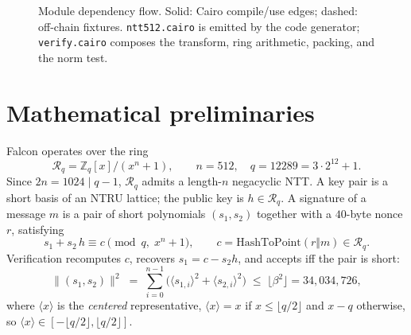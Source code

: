 \documentclass[11pt]{article}
\newcommand{\Zq}{\mathbb{Z}_q}
\newcommand{\Rq}{\mathcal{R}_q}
\newcommand{\HtP}{\mathrm{HashToPoint}}
\begin{document}
\begin{figure}[h]
\centering
{}
\caption{Module dependency flow. Solid: Cairo compile/use edges; dashed: off-chain
fixtures. \texttt{ntt512.cairo} is emitted by the code generator; \texttt{verify.cairo}
composes the transform, ring arithmetic, packing, and the norm test.}
\label{fig:files}
\end{figure}

\section{Mathematical preliminaries}
Falcon operates over the ring
\[
  \Rq = \Zq[x]/(x^{n}+1),\qquad n=512,\quad q=12289=3\cdot 2^{12}+1 .
\]
Since $2n=1024 \mid q-1$, $\Rq$ admits a length-$n$ negacyclic NTT. A key pair is a short
basis of an NTRU lattice; the public key is $h\in\Rq$. A signature of a message $m$ is a pair
of short polynomials $(s_1,s_2)$ together with a $40$-byte nonce $r$, satisfying
\begin{equation}
  s_1 + s_2\,h \equiv c \pmod{q,\;x^n+1},
  \qquad c = \HtP(r\Vert m)\in\Rq .
  \label{eq:relation}
\end{equation}
Verification recomputes $c$, recovers $s_1 = c - s_2 h$, and accepts iff the pair is short:
\begin{equation}
  \lVert (s_1,s_2)\rVert^2 \;=\; \sum_{i=0}^{n-1}\bigl(\langle s_{1,i}\rangle^2 + \langle s_{2,i}\rangle^2\bigr)
  \;\le\; \lfloor\beta^2\rfloor = 34{,}034{,}726,
  \label{eq:norm}
\end{equation}
where $\langle x\rangle$ is the \emph{centered} representative,
$\langle x\rangle = x$ if $x\le \lfloor q/2\rfloor$ and $x-q$ otherwise, so
$\langle x\rangle\in[-\lfloor q/2\rfloor,\lfloor q/2\rfloor]$.
\end{document}
